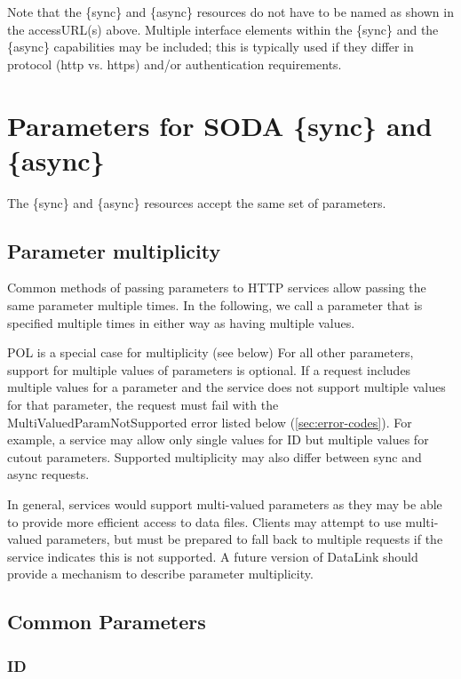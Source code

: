 \documentclass[11pt,a4paper]{ivoa}
\begin{document}
Note that the \{sync\} and \{async\} resources do not have to be
named as shown in the accessURL(s) above. Multiple
interface elements within the \{sync\} and the \{async\} capabilities
may be included; this is typically used if they differ in
protocol (http vs. https) and/or authentication
requirements.


\section{Parameters for SODA \{sync\} and \{async\}}
\label{sec:parameters}

The \{sync\} and \{async\} resources accept the same set of
parameters.

\subsection{Parameter multiplicity}
Common methods of passing parameters to
HTTP services  allow passing the same parameter multiple times.
In the following, we call a parameter that is specified multiple times
in either way as having multiple values.

POL is a special case for multiplicity (see below)
 For all other parameters, support for multiple values of parameters is optional. 
If a request includes multiple values for a parameter and the 
service does not support multiple values for that parameter, the 
request must fail with the MultiValuedParamNotSupported error listed
below (\ref{sec:error-codes}). For example, a service may 
allow only single values for ID but multiple values for cutout parameters. 
Supported multiplicity may also differ between {sync} and {async} requests.

\enlargethispage{\baselineskip}

In general, services would support multi-valued parameters as they may be 
able to provide more efficient access to data files. Clients may attempt to use 
multi-valued parameters, but must be prepared to fall back to multiple requests 
if the service indicates this is not supported. A future version of
DataLink should provide a mechanism to describe parameter 
multiplicity.

\subsection{Common Parameters}

\subsubsection{ID}
\label{sec:ID}
\end{document}
